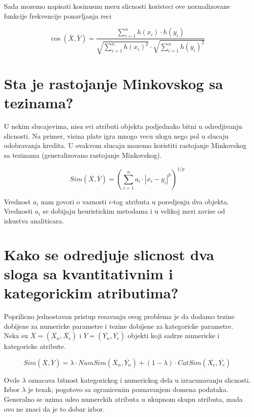 \documentclass[a4paper]{article}
\begin{document}
Sada mozemo napisati kosinusnu meru slicnosti koristeci ove normalizovane funkcije frekvencije
ponavljanja reci

\[
    \cos(\overline{X}, \overline{Y}) =
    \dfrac{\sum_{i=1}^{n} h(x_i) \cdot h(y_i)}{\sqrt{\sum_{i=1}^{n} h(x_i)^2} \cdot
        \sqrt{\sum_{i=1}^{n} h(y_i)^2}}
\]


\section{Sta je rastojanje Minkovskog sa tezinama?}

U nekim slucajevima, nisu svi atributi objekta podjednako bitni u odredjivanju slicnosti. Na primer,
visina plate igra mnogo vecu ulogu nego pol u slucaju odobravanja kredita. U ovakvom slucaju mozemo
koristiti rastojanje Minkovskog sa tezinama (generalizovano rastojanje Minkovskog).

\[
    Sim(\overline{X}, \overline{Y}) = \left(\sum_{i=1}^{n} a_i \cdot |x_i - y_i|^p\right)^{1/p}
\]

Vrednost \(a_i\) nam govori o vaznosti \(i\)-tog atributa u poredjenju dva
objekta. Vrednosti \(a_i\) se dobijaju heuristickim metodama i u velikoj meri zavise od iskustva
analiticara.

\section{Kako se odredjuje slicnost dva sloga sa kvantitativnim i kategorickim atributima?}

Poprilicno jednostavan pristup resavanju ovog problema je da dodamo tezine dobijene za numericke
parametre i tezine dobijene za kategoricke parametre. Neka su
\(\overline{X}=(\overline{X_n}, \overline{X_c})\) i \(\overline{Y}=(\overline{Y_n}, \overline{Y_c})\)
objekti koji sadrze numericke i kategoricke atribute.

\[
    Sim(\overline{X}, \overline{Y}) =
        \lambda \cdot NumSim(\overline{X_n}, \overline{Y_n})
        + (1 - \lambda) \cdot CatSim(\overline{X_c}, \overline{Y_c})
\]

Ovde \(\lambda\) oznacava bitnost kategorickog i numerickog dela u izracunavanju slicnosti. Izbor
\(\lambda\) je tezak, pogotovo sa ogranicenim poznavanjem domena podataka. Generalno se uzima udeo
numerckih atributa u ukupnom skupu atributa, mada ovo ne znaci da je to dobar izbor.
\end{document}
